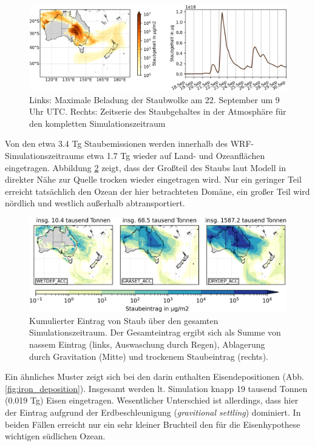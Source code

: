 \documentclass[12pt,a4paper,onecolumn]{scrartcl}
\begin{document}
\begin{figure}
\includegraphics[width=\textwidth]{bilder/dustload_time.png}
\caption{Links: Maximale Beladung der Staubwolke am 22. September um 9 Uhr UTC. Rechts: Zeitserie des Staubgehaltes in der Atmosphäre für den kompletten Simulationszeitraum} \label{fig:dustload_time}
\end{figure}
Von den etwa 3.4 Tg Staubemissionen werden innerhalb des WRF-Simulationszeitraums etwa 1.7 Tg wieder auf Land- und Ozeanflächen eingetragen. Abbildung \ref{fig:deposition} zeigt, dass der Großteil des Staubs laut Modell in direkter Nähe zur Quelle trocken wieder eingetragen wird. Nur ein geringer Teil erreicht tatsächlich den Ozean der hier betrachteten Domäne, ein großer Teil wird nördlich und westlich außerhalb abtransportiert. 
\begin{figure}
\includegraphics[width=\textwidth]{bilder/dust_deposition_vars.png}
\caption{Kumulierter Eintrag von Staub über den gesamten Simulationszeitraum. Der Gesamteintrag ergibt sich als Summe von nassem Eintrag (links, Auswaschung durch Regen), Ablagerung durch Gravitation (Mitte) und trockenem Staubeintrag (rechts).} \label{fig:deposition}
\end{figure}
Ein ähnliches Muster zeigt sich bei den darin enthalten Eisendepositionen (Abb. \ref{fig:iron_deposition}). Insgesamt werden lt. Simulation knapp 19 tausend Tonnen (0.019 Tg) Eisen eingetragen. Wesentlicher Unterschied ist allerdings, dass hier der Eintrag aufgrund der Erdbeschleunigung (\textit{gravitional settling}) dominiert. In beiden Fällen erreicht nur ein sehr kleiner Bruchteil den für die Eisenhypothese wichtigen südlichen Ozean.
\end{document}
